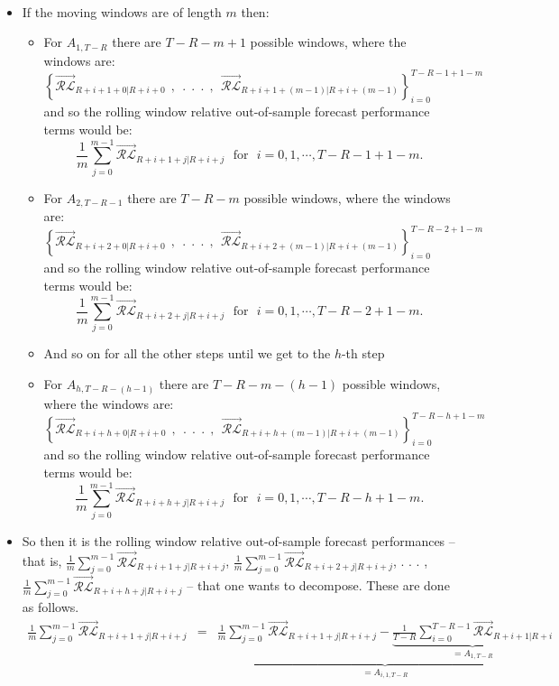 \documentclass[11pt]{article}
\begin{document}
\begin{itemize}
\begin{eqnarray}
\end{eqnarray}
\item If the moving windows are of length $m$ then:
\begin{itemize}
\item For $A_{1,T\!-\!R}$ there are $T-R-m+1$ possible windows, where the windows are: 
\[\left\{\overrightarrow{\mathcal{RL}}_{R+i+1+0|R+i+0}\ \ , \ \  . \ \  . \ \  . \ \ ,\ \ \overrightarrow{\mathcal{RL}}_{R+i+1+(m-1)|R+i+(m-1)}\right\}_{i=0}^{T-R-1+1-m}\] 
and so the rolling window relative out-of-sample forecast performance terms would be:
\[\frac{1}{m}\sum_{j=0}^{m-1}\overrightarrow{\mathcal{RL}}_{R+i+1+j|R+i+j}\ \ \ \mathrm{for} \ \ \ i=0,1,\cdots,T\!-\!R\!-\!1\!+\!1\!-\!m. \]
\item For $A_{2,T\!-\!R\!-\!1}$ there are $T-R-m$ possible windows, where the windows are: 
\[\left\{\overrightarrow{\mathcal{RL}}_{R+i+2+0|R+i+0}\ \ , \ \  . \ \  . \ \  . \ \ ,\ \ \overrightarrow{\mathcal{RL}}_{R+i+2+(m-1)|R+i+(m-1)}\right\}_{i=0}^{T-R-2+1-m}\] 
and so the rolling window relative out-of-sample forecast performance terms would be:
\[\frac{1}{m}\sum_{j=0}^{m-1}\overrightarrow{\mathcal{RL}}_{R+i+2+j|R+i+j}\ \ \ \mathrm{for} \ \ \ i=0,1,\cdots,T\!-\!R\!-\!2\!+\!1\!-\!m. \]
\item And so on for all the other steps until we get to the $h$-th step
\item For $A_{h,T\!-\!R\!-\!(h-1)}$ there are $T-R-m-(h-1)$ possible windows, where the windows are: 
\[\left\{\overrightarrow{\mathcal{RL}}_{R+i+h+0|R+i+0}\ \ , \ \  . \ \  . \ \  . \ \ ,\ \ \overrightarrow{\mathcal{RL}}_{R+i+h+(m-1)|R+i+(m-1)}\right\}_{i=0}^{T-R-h+1-m}\] 
and so the rolling window relative out-of-sample forecast performance terms would be:
\[\frac{1}{m}\sum_{j=0}^{m-1}\overrightarrow{\mathcal{RL}}_{R+i+h+j|R+i+j}\ \ \ \mathrm{for} \ \ \ i=0,1,\cdots,T\!-\!R\!-\!h\!+\!1\!-\!m. \]
\end{itemize}
\item So then it is the rolling window relative out-of-sample forecast performances -- that is, $\frac{1}{m}\sum_{j=0}^{m-1}\overrightarrow{\mathcal{RL}}_{R+i+1+j|R+i+j}$, $\frac{1}{m}\sum_{j=0}^{m-1}\overrightarrow{\mathcal{RL}}_{R+i+2+j|R+i+j}$, . . . , $\frac{1}{m}\sum_{j=0}^{m-1}\overrightarrow{\mathcal{RL}}_{R+i+h+j|R+i+j}$ -- that one wants to decompose.  These are done as follows.
\begin{eqnarray}
\frac{1}{m}\sum_{j=0}^{m-1}\overrightarrow{\mathcal{RL}}_{R+i+1+j|R+i+j}\!\!\!\!&=&\!\!\!\!\underbrace{\frac{1}{m}\sum_{j=0}^{m-1}\overrightarrow{\mathcal{RL}}_{R+i+1+j|R+i+j}-\underbrace{\frac{1}{T\!-\!R}\!\!\sum_{i=0}^{T-R-1}\!\!\overrightarrow{\mathcal{RL}}_{R+i+1|R+i}}_{=A_{1,T\!-\!R}}}_{=A_{i,1,T-R}} \nonumber \\

\end{eqnarray}
\end{itemize}
\end{document}
